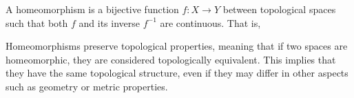 \documentclass[answers,12pt,addpoints]{exam}
\begin{document}
\begin{definition}
    [Homeomorphism]
A homeomorphism is a bijective function $f:X\to Y$ between
topological spaces such that both $f$ and its inverse $f^{-1}$ are continuous.
That is,

    Homeomorphisms preserve topological properties, meaning that if two spaces are homeomorphic, they are considered topologically equivalent. This implies that they have the same topological structure, even if they may differ in other aspects such as geometry or metric properties.
\end{definition}
\end{document}

